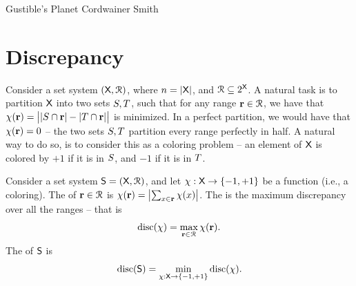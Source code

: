 %

\ChapterPrefix{}
\ChapterGen{}



%
{Gustible's Planet}%
{Cordwainer Smith}


\section{Discrepancy}

Consider a set system $(\textsf{X},\EuScript{R})$, where
$n =\left| {\textsf{X}} \right|$, and $\EuScript{R} \subseteq 2^{\textsf{X}}$. A
natural task is to partition $\textsf{X}$ into two sets
$S, T$, such that for any range $\mathbf{r} \in \EuScript{R}$, we have
that
\begin{math}
    \chi(\mathbf{r}) = \left| {\bigl. \left| {S \cap \mathbf{r}} \right| -
       \left| {T \cap \mathbf{r}} \right|} \right|
\end{math}
is minimized. In a perfect partition, we would have that
$\chi(\mathbf{r}) = 0$ -- the two sets $S,T$ partition every range
perfectly in half. A natural way to do so, is to consider this as a
coloring problem -- an element of $\textsf{X}$ is colored by $+1$ if
it is  in $S$, and $-1$ if it is in $T$.


\begin{defn} 
    Consider a set system $\mathsf{S} = (\textsf{X},\EuScript{R})$, and let
    $\chi: \textsf{X} \rightarrow \left\{ {-1,+1} \right\}$ be a function (i.e., a
    coloring).  The  of $\mathbf{r} \in \EuScript{R}$ is
    $\chi(\mathbf{r}) = \left| {\sum_{x \in \mathbf{r}} \chi(x)} \right|$.  The
     is the maximum discrepancy over all
    the ranges -- that is
    \begin{equation*}
        \discX{\chi} = \max_{\range \in \Ranges} \chi(\range).
    \end{equation*}
    The  of $\mathsf{S}$ is
    \begin{equation*}
        \discX{\RangeSpace}%
        =%
        \min_{\chi:\GroundSet \rightarrow \brc{-1,+1}} \discX{\chi}.
    \end{equation*}    
\end{defn}

